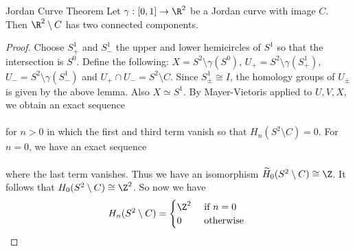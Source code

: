 \documentclass[a4paper]{article}
\begin{document}
\begin{thm}{Jordan Curve Theorem}{} Let $\gamma:[0,1]\to\R^2$ be a Jordan curve with image $C$. Then $\R^2\setminus C$ has two connected components.  
\begin{proof}
Choose $S_+^1$ and $S_-^1$ the upper and lower hemicircles of $S^1$ so that the intersection is $S^0$. Define the following: $X=S^2\setminus\gamma(S^0)$, $U_+=S^2\setminus\gamma(S_+^1)$, $U_-=S^2\setminus\gamma(S_-^1)$ and $U_+\cap U_-=S^2\setminus C$. Since $S_\pm^1\cong I$, the homology groups of $U_\pm$ is given by the above lemma. Also $X\simeq S^1$. By Mayer-Vietoris applied to $U,V,X$, we obtain an exact sequence \\
\\
for $n>0$ in which the first and third term vanish so that $H_n(S^2\setminus C)=0$. For $n=0$, we have an exact sequence \\
\\
where the last term vanishes. Thus we have an isomorphism $\widetilde{H}_0(S^2\setminus C)\cong\Z$. It follows that $H_0(S^2\setminus C)\cong\Z^2$. So now we have $$H_n(S^2\setminus C)=\begin{cases}
\Z^2 & \text{ if } n=0\\
0 & \text{ otherwise }
\end{cases}$$


\end{proof}
\end{thm}
\end{document}
